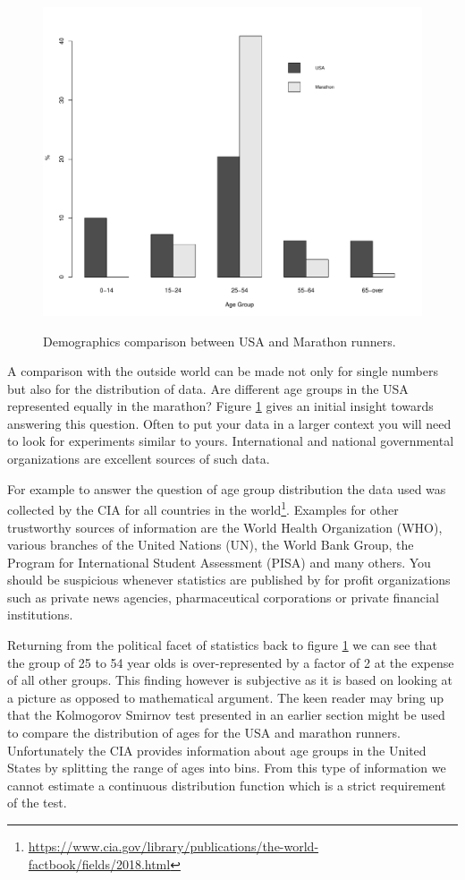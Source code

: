 \documentclass{tufte-book} %
\begin{document}
\begin{figure}
	\centering
	\includegraphics{graphics/barplot-ages-usa-marathon}
	\label{img:ages-usa-marathon}
	\caption{Demographics comparison between USA and Marathon runners.}
\end{figure}

A comparison with the outside world can be made not only for single numbers but also for the distribution of data. Are different age groups in the USA represented equally in the marathon? Figure \ref{img:ages-usa-marathon} gives an initial insight towards answering this question. Often to put your data in a larger context you will need to look for experiments similar to yours. International and national governmental organizations are excellent sources of such data. 

For example to answer the question of age group distribution the data used was collected by the CIA for all countries in the world\footnote{\url{https://www.cia.gov/library/publications/the-world-factbook/fields/2018.html}}. Examples for other trustworthy sources of information are the World Health Organization (WHO), various branches of the United Nations (UN), the World Bank Group, the Program for International Student Assessment (PISA) and many others. You should be suspicious whenever statistics are published by for profit organizations such as private news agencies, pharmaceutical corporations or private financial institutions.

Returning from the political facet of statistics back to figure \ref{img:ages-usa-marathon} we can see that the group of 25 to 54 year olds is over-represented by a factor of 2 at the expense of all other groups. This finding however is subjective as it is based on looking at a picture as opposed to mathematical argument. The keen reader may bring up that the Kolmogorov Smirnov test presented in an earlier section might be used to compare the distribution of ages for the USA and marathon runners. Unfortunately the CIA provides information about age groups in the United States by splitting the range of ages into bins. From this type of information we cannot estimate a continuous distribution function which is a strict requirement of the test.
\end{document}
